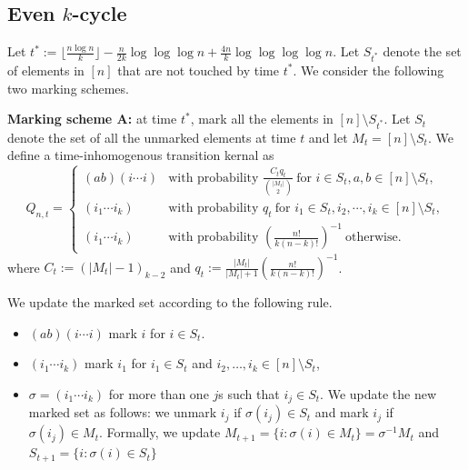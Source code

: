 

\subsection{Even $k$-cycle}
Let $t^* := \lfloor  \frac{n\log n}{k}\rfloor - \frac{n}{2k}\log\log \log n+\frac{4n}{k}\log\log\log \log n$. Let $S_{t^*}$ denote the set of elements in $[n]$ that are not touched by time $t^*$. We consider the following two marking schemes.

\noindent\textbf{Marking scheme A:} at time $t^*$, mark all the elements in $[n] \setminus S_{t^*}$. Let $S_t$ denote the set of all the unmarked elements at time $t$ and let $M_t = [n] \setminus S_t$. 
We define a time-inhomogenous transition kernal as
\[
Q_{n,t}=\begin{cases}
(ab)(i\cdots i) & \text{with probability } \frac{C_tq_t}{\binom{|M_t|}{2}} \ \text{for } i\in S_{t},a,b\in [n]\setminus S_t,\\[6pt]
(i_1 \cdots i_k) & \text{with probability } q_t \ \text{for } i_1 \in S_{t}, i_2, \cdots, i_k \in [n] \setminus S_{t},\\[6pt]
(i_1 \cdots i_k) & \text{with probability } \left( \frac{n!}{k(n-k)!} \right)^{-1} \ \text{otherwise}.
\end{cases}
\]
where $C_t := (|M_t|-1)_{k-2}$ and $q_t := \frac{|M_t|}{|M_t|+1}\left(\frac{n!}{k(n-k)!}\right)^{-1}$.

We update the marked set according to the following rule.
\begin{itemize}
    \item $(ab)(i\cdots i)$ \quad mark $i$ for $i \in S_{t}$.
    \item $(i_1 \cdots i_k)$ mark $i_1$ for $i_1 \in S_t$ and $i_2,\dots, i_k \in [n]\setminus S_t$,
    \item $\sigma=(i_1 \cdots i_k)$ for more than one $j$s such that $i_j\in S_t$. We update the new marked set as follows: we unmark $i_j$ if $\sigma(i_j)\in S_t$ and mark $i_j$ if $\sigma(i_j)\in M_t$. Formally, we update $M_{t+1}=\{i:\sigma(i)\in M_t\} = \sigma^{-1}M_t$ and $S_{t+1}=\{i:\sigma(i)\in S_t\}$
\end{itemize}

